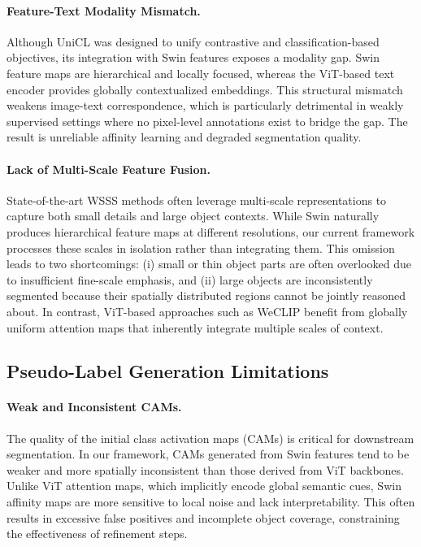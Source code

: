 \paragraph{Feature-Text Modality Mismatch.}
Although UniCL was designed to unify contrastive and classification-based objectives, its integration with Swin features exposes a modality gap. Swin feature maps are hierarchical and locally focused, whereas the ViT-based text encoder provides globally contextualized embeddings. This structural mismatch weakens image-text correspondence, which is particularly detrimental in weakly supervised settings where no pixel-level annotations exist to bridge the gap. The result is unreliable affinity learning and degraded segmentation quality.

\paragraph{Lack of Multi-Scale Feature Fusion.}
State-of-the-art WSSS methods often leverage multi-scale representations to capture both small details and large object contexts. While Swin naturally produces hierarchical feature maps at different resolutions, our current framework processes these scales in isolation rather than integrating them. This omission leads to two shortcomings: (i) small or thin object parts are often overlooked due to insufficient fine-scale emphasis, and (ii) large objects are inconsistently segmented because their spatially distributed regions cannot be jointly reasoned about. In contrast, ViT-based approaches such as WeCLIP benefit from globally uniform attention maps that inherently integrate multiple scales of context.

\subsection{Pseudo-Label Generation Limitations}

\paragraph{Weak and Inconsistent CAMs.}
The quality of the initial class activation maps (CAMs) is critical for downstream segmentation. In our framework, CAMs generated from Swin features tend to be weaker and more spatially inconsistent than those derived from ViT backbones. Unlike ViT attention maps, which implicitly encode global semantic cues, Swin affinity maps are more sensitive to local noise and lack interpretability. This often results in excessive false positives and incomplete object coverage, constraining the effectiveness of refinement steps.

